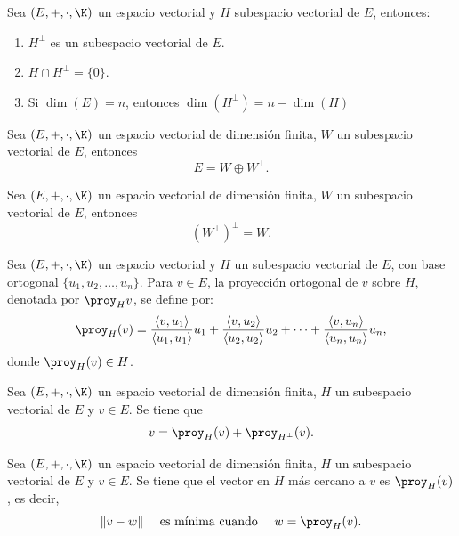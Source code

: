 \documentclass[a4,11pt]{aleph-notas}
\begin{document}
\begin{teo}
    Sea $(E,+,\cdot,\K)$ un espacio vectorial y
    $H$ subespacio vectorial de $E$, entonces:
    \begin{enumerate}
        \item $H^\perp$ es un subespacio vectorial de $E$.
        \item $H \cap H^\perp = \{0\}$.
        \item Si $\dim(E) = n$, entonces $\dim(H^\perp) = n - \dim(H)$
    \end{enumerate}
\end{teo}


\begin{teo}
    Sea $(E,+,\cdot,\K)$ un espacio vectorial de dimensión finita, $W$ un subespacio vectorial de $E$, entonces 
    \[
    E = W \oplus W^\perp.
    \]
\end{teo}

\begin{teo}
    Sea $(E,+,\cdot,\K)$ un espacio vectorial de dimensión finita, $W$ un subespacio vectorial de $E$, entonces 
    \[
    \left(W^\perp\right)^\perp =  W.
    \]
\end{teo}

\begin{defi}
    Sea $(E,+,\cdot,\K)$ un espacio vectorial y
    $H$ un subespacio vectorial de $E$, con base ortogonal $\{u_1, u_2, \ldots, u_n \}$. Para $v \in E$, la proyección ortogonal de $v$ sobre $H$, denotada por $\proy_H v$, se define por:
    \[
       \proy_H( v) = 
       \dfrac{\langle v,u_1 \rangle}{\langle u_1, u_1 \rangle}u_1 +
       \dfrac{\langle v,u_2 \rangle}{\langle u_2, u_2 \rangle}u_2 +
       \cdots +
       \dfrac{\langle v,u_n \rangle}{\langle u_n, u_n \rangle}u_n,
    \]
    donde $\proy_H (v) \in H$.
\end{defi}


\begin{teo}
    Sea $(E,+,\cdot,\K)$ un espacio vectorial de dimensión finita, $H$ un subespacio vectorial de $E$ y $v \in E$. Se tiene que
    \[
        v = \proy_H( v) + \proy_{H^\perp}( v).
    \]
\end{teo}

\begin{teo}
    Sea $(E,+,\cdot,\K)$ un espacio vectorial de dimensión finita, $H$ un subespacio vectorial de $E$ y $v \in E$. Se tiene que el vector en $H$ más cercano a $v$ es $\proy_H(v)$, es decir,
    \[
    \|v-w\| \quad \text{ es mínima cuando } \quad w = \proy_H(v).
    \]
\end{teo}
\end{document}
